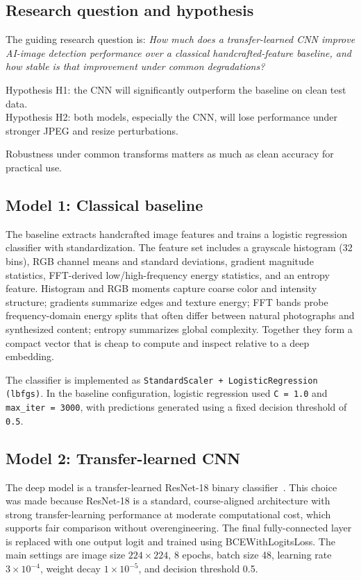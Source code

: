 \documentclass[conference]{IEEEtran}
\begin{document}
\subsection{Research question and hypothesis}
The guiding research question is: \emph{How much does a transfer-learned CNN improve AI-image detection performance over a classical handcrafted-feature baseline, and how stable is that improvement under common degradations?}

Hypothesis H1: the CNN will significantly outperform the baseline on clean test data.\\
Hypothesis H2: both models, especially the CNN, will lose performance under stronger JPEG and resize perturbations.

Robustness under common transforms matters as much as clean accuracy for practical use.

\subsection{Model 1: Classical baseline}
The baseline extracts handcrafted image features and trains a logistic regression classifier with standardization. The feature set includes a grayscale histogram (32 bins), RGB channel means and standard deviations, gradient magnitude statistics, FFT-derived low/high-frequency energy statistics, and an entropy feature. Histogram and RGB moments capture coarse color and intensity structure; gradients summarize edges and texture energy; FFT bands probe frequency-domain energy splits that often differ between natural photographs and synthesized content; entropy summarizes global complexity. Together they form a compact vector that is cheap to compute and inspect relative to a deep embedding.

The classifier is implemented as \texttt{StandardScaler + LogisticRegression (lbfgs)}.
In the baseline configuration, logistic regression used \texttt{C = 1.0} and \texttt{max\_iter = 3000}, with predictions generated using a fixed decision threshold of \texttt{0.5}.

\subsection{Model 2: Transfer-learned CNN}
The deep model is a transfer-learned ResNet-18 binary classifier~\cite{he2016resnet}. This choice was made because ResNet-18 is a standard, course-aligned architecture with strong transfer-learning performance at moderate computational cost, which supports fair comparison without overengineering. The final fully-connected layer is replaced with one output logit and trained using BCEWithLogitsLoss. The main settings are image size $224 \times 224$, 8 epochs, batch size 48, learning rate $3 \times 10^{-4}$, weight decay $1 \times 10^{-5}$, and decision threshold 0.5.
\end{document}
